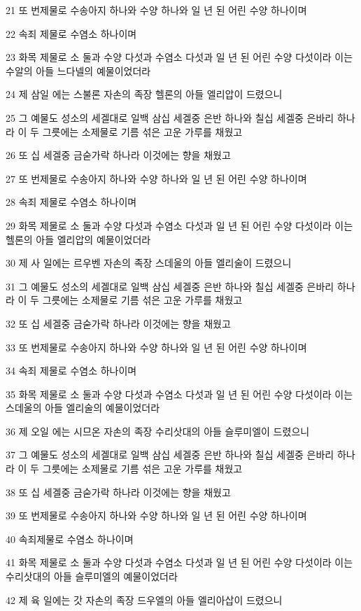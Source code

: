 \par 21 또 번제물로 수송아지 하나와 수양 하나와 일 년 된 어린 수양 하나이며
\par 22 속죄 제물로 수염소 하나이며
\par 23 화목 제물로 소 둘과 수양 다섯과 수염소 다섯과 일 년 된 어린 수양 다섯이라 이는 수알의 아들 느다넬의 예물이었더라
\par 24 제 삼일 에는 스불론 자손의 족장 헬론의 아들 엘리압이 드렸으니
\par 25 그 예물도 성소의 세겔대로 일백 삼십 세겔중 은반 하나와 칠십 세겔중 은바리 하나라 이 두 그릇에는 소제물로 기름 섞은 고운 가루를 채웠고
\par 26 또 십 세겔중 금숟가락 하나라 이것에는 향을 채웠고
\par 27 또 번제물로 수송아지 하나와 수양 하나와 일 년 된 어린 수양 하나이며
\par 28 속죄 제물로 수염소 하나이며
\par 29 화목 제물로 소 둘과 수양 다섯과 수염소 다섯과 일 년 된 어린 수양 다섯이라 이는 헬론의 아들 엘리압의 예물이었더라
\par 30 제 사 일에는 르우벤 자손의 족장 스데울의 아들 엘리술이 드렸으니
\par 31 그 예물도 성소의 세겔대로 일백 삼십 세겔중 은반 하나와 칠십 세겔중 은바리 하나라 이 두 그릇에는 소제물로 기름 섞은 고운 가루를 채웠고
\par 32 또 십 세겔중 금숟가락 하나라 이것에는 향을 채웠고
\par 33 또 번제물로 수송아지 하나와 수양 하나와 일 년 된 어린 수양 하나이며
\par 34 속죄 제물로 수염소 하나이며
\par 35 화목 제물로 소 둘과 수양 다섯과 수염소 다섯과 일 년 된 어린 수양 다섯이라 이는 스데울의 아들 엘리술의 예물이었더라
\par 36 제 오일 에는 시므온 자손의 족장 수리삿대의 아들 슬루미엘이 드렸으니
\par 37 그 예물도 성소의 세겔대로 일백 삼십 세겔중 은반 하나와 칠십 세겔중 은바리 하나라 이 두 그릇에는 소제물로 기름 섞은 고운 가루를 채웠고
\par 38 또 십 세겔중 금숟가락 하나라 이것에는 향을 채웠고
\par 39 또 번제물로 수송아지 하나와 수양 하나와 일 년 된 어린 수양 하나이며
\par 40 속죄제물로 수염소 하나이며
\par 41 화목 제물로 소 둘과 수양 다섯과 수염소 다섯과 일 년 된 어린 수양 다섯이라 이는 수리삿대의 아들 슬루미엘의 예물이었더라
\par 42 제 육 일에는 갓 자손의 족장 드우엘의 아들 엘리아삽이 드렸으니
